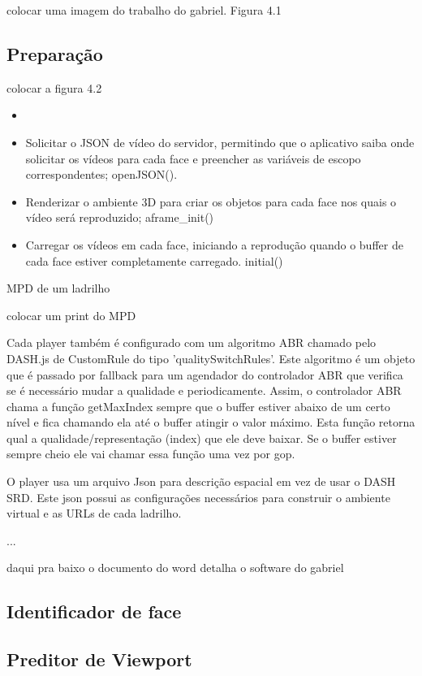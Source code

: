 colocar uma imagem do trabalho do gabriel. Figura 4.1

\subsection{Preparação}

colocar a figura 4.2

\begin{itemize}
	\item 
	\item Solicitar o JSON de vídeo do servidor, permitindo que o aplicativo saiba onde solicitar os vídeos para cada face e preencher as variáveis de escopo correspondentes; openJSON(). 
	\item Renderizar o ambiente 3D para criar os objetos para cada face nos quais o vídeo será reproduzido; aframe\_init()
	\item Carregar os vídeos em cada face, iniciando a reprodução quando o buffer de cada face estiver completamente carregado. initial()
\end{itemize}

MPD de um ladrilho

colocar um print do MPD

Cada player também é configurado com um algoritmo ABR chamado pelo DASH.js de CustomRule do tipo 'qualitySwitchRules'. Este algoritmo é um objeto que é passado por fallback para um agendador do controlador ABR que verifica se é necessário mudar a qualidade e periodicamente. Assim, o controlador ABR chama a função getMaxIndex sempre que o buffer estiver abaixo de um certo nível e fica chamando ela até o buffer atingir o valor máximo. Esta função retorna qual a qualidade/representação (index) que ele deve baixar. Se o buffer estiver sempre cheio ele vai chamar essa função uma vez por gop.

O player usa um arquivo Json para descrição espacial em vez de usar o DASH SRD. Este json possui as configurações necessários para construir o ambiente virtual e as URLs de cada ladrilho.



...

daqui pra baixo o documento do word detalha o software do gabriel

\subsection{Identificador de face}


\subsection{Preditor de Viewport}

